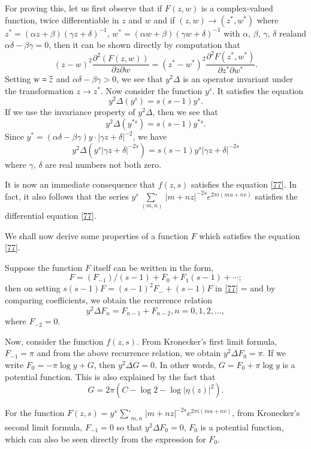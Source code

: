 For proving this, let us first observe that if $F(z,w)$ is a
complex-valued function, twice differentiable in $z$ and $w$ and if
$(z,w)\to (z^{\ast},w^{\ast})$ where $z^{\ast} = (\alpha z+\beta)(\gamma
z+\delta)^{-1}$, $w^{\ast}=(\alpha w+\beta)(\gamma w+\delta)^{-1}$
with $\alpha$, $\beta$, $\gamma$, $\delta$ 
real\pageoriginale and $\alpha\delta-\beta\gamma=0$, then it can be
shown directly by computation that
$$
(z-w)^{2}\frac{\partial^{2}(F(z,w))}{\partial z\partial
  w}=(z^{\ast}-w^{\ast})^{2}\frac{\partial^{2}F(z^{\ast},w^{\ast})}{\partial
  z^{\ast}\partial w^{\ast}}.
$$
Setting $w=\overline{z}$ and $\alpha\delta-\beta\gamma>0$, we see that
$y^{2}\Delta$ is an operator invariant under the transformation $z\to
z^{\ast}$. Now consider the function $y^{s}$. It satisfies the
equation
$$
y^{2}\Delta(y^{s})=s(s-1)y^{s}.
$$
If we use the invariance property of $y^{2}\Delta$, then we see that
$$
y^{2}\Delta(y^{\ast s})=s(s-1)y^{\ast s}.
$$
Since $y^{\ast}=(\alpha\delta-\beta\gamma)y\cdot|\gamma
z+\delta|^{-2}$, we have
$$
y^{2}\Delta(y^{s}|\gamma z+\delta|^{-2s})=s(s-1)y^{s}|\gamma
z+\delta|^{-2s}
$$
where $\gamma$, $\delta$ are real numbers not both zero.

It is now an immediate consequence that $f(z,s)$ satisfies the
equation \eqref{77}. In fact, it also follows that the series
$y^{s}\mathop{{\sum}'}\limits_{(m,n)}|m+nz|^{-2s}e^{2\pi i(mu+nv)}$
satisfies the differential equation \eqref{77}.

We shall now derive some properties of a function $F$ which satisfies
the equation \eqref{77}.

Suppose the function $F$ itself can be written in the form,
$$
F=(F_{-1})/(s-1)+F_{0}+F_{1}(s-1)+\cdots;
$$
then on setting $s(s-1)F=(s-1)^{2}F_{-}+(s-1)F$ in \eqref{77} = and by
comparing coefficients, we obtain the recurrence relation
$$
y^{2}\Delta F_{n}=F_{n-1}+F_{n-2}, n=0,1,2,\ldots,
$$
where $F_{-2}=0$.

Now, consider the function $f(z,s)$. From Kronecker's first limit
formula, $F_{-1}=\pi$ and from the above recurrence relation, we
obtain $y^{2}\Delta F_{0}=\pi$. If we write $F_{0}=-\pi\log y+G$, then
$y^{2}\Delta G=0$. In other words, $G=F_{0}+\pi \log y$ is a potential
function. This is also explained by the fact that
$$
G=2\pi(C-\log 2-\log|\eta(z)|^{2}).
$$\pageoriginale

For the function
$F(z,s)=y^{s}\mathop{{\sum}'}_{m,n}|m+nz|^{-2s}e^{2\pi i(mu+nv)}$,
from Kronecker's second limit formula, $F_{-1}=0$ so that $y^{2}\Delta
F_{0}=0$, \ie $F_{0}$ is a potential function, which can also be seen
directly from the expression for $F_{0}$.

